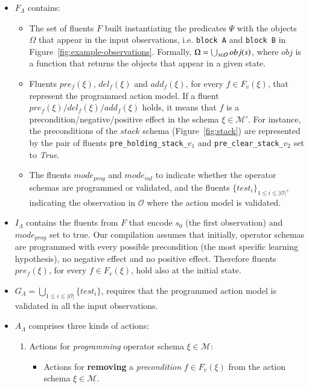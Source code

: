 \documentclass[3p,times]{elsarticle}
\begin{document}
\begin{itemize}
\item $F_{\Lambda}$ contains:
\begin{itemize}
\item The set of fluents $F$ built instantiating the predicates $\Psi$ with the objects $\Omega$ that appear in the input observations, i.e. {\tt\small block A} and {\tt\small block B} in Figure~\ref{fig:example-observations}. Formally, $\Omega=\bigcup_{\small s\in\mathcal{O}} obj(s)$, where $obj$ is a function that returns the objects that appear in a given state.
\item Fluents $pre_f(\xi)$, $del_f(\xi)$ and $add_f(\xi)$, for every $f\in F_v(\xi)$, that represent the programmed action model. If a fluent $pre_f(\xi)/del_f(\xi)/add_f(\xi)$ holds, it means that $f$ is a precondition/negative/positive effect in the schema $\xi\in \mathcal{M}'$. For instance, the preconditions of the $stack$ schema (Figure~\ref{fig:stack}) are represented by the pair of fluents {\small\tt pre\_holding\_stack\_$v_1$} and {\small\tt pre\_clear\_stack\_$v_2$} set to {\em True}.
\item The fluents $mode_{prog}$ and $mode_{val}$ to indicate whether the operator schemas are programmed or validated, and the fluents $\{test_i\}_{1\leq i\leq |\mathcal{O}|}$, indicating the observation in $\mathcal{O}$ where the action model is validated.
\end{itemize}
\item $I_{\Lambda}$ contains the fluents from $F$ that encode $s_0$ (the first observation) and $mode_{prog}$ set to true. Our compilation assumes that initially, operator schemas are programmed with every possible precondition (the most specific learning hypothesis), no negative effect and no positive effect. Therefore fluents $pre_f(\xi)$, for every $f\in F_v(\xi)$, hold also at the initial state. 

\item $G_{\Lambda}=\bigcup_{1\leq i\leq |\mathcal{O}|}\{test_i\}$, requires that the programmed action model is validated in all the input observations.
\item $A_{\Lambda}$ comprises three kinds of actions:
\begin{enumerate}
\item Actions for {\em programming} operator schema $\xi\in\mathcal{M}$:
\begin{itemize}
\item Actions for {\bf removing} a {\em precondition} $f\in F_v(\xi)$ from the action schema $\xi\in\mathcal{M}$.


\end{itemize}
\end{enumerate}
\end{itemize}
\end{document}
